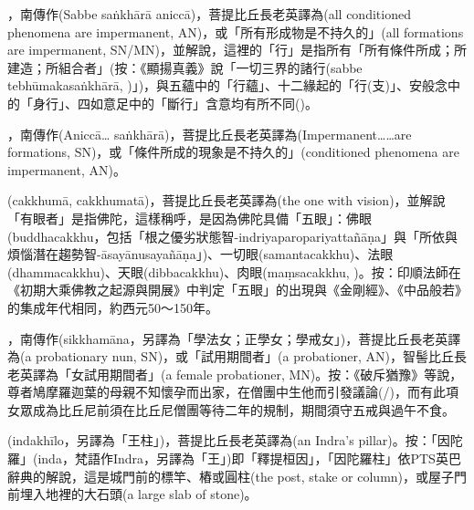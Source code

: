 \startitemgroup[noteitems]
\item{}，南傳作(Sabbe saṅkhārā aniccā)，菩提比丘長老英譯為(all conditioned phenomena are impermanent, AN)，或「所有形成物是不持久的」(all formations are impermanent, SN/MN)，並解說，這裡的「行」是指所有「所有條件所成；所建造；所組合者」(按：《顯揚真義》說「一切三界的諸行(sabbe tebhūmakasaṅkhārā, )」)，與五蘊中的「行蘊」、十二緣起的「行(支)」、安般念中的「身行」、四如意足中的「斷行」含意均有所不同()。
\item{}，南傳作(Aniccā… saṅkhārā)，菩提比丘長老英譯為(Impermanent……are formations, SN)，或「條件所成的現象是不持久的」(conditioned phenomena are impermanent, AN)。
\stopitemgroup

\startitemgroup[noteitems]
\item{}(cakkhumā, cakkhumatā)，菩提比丘長老英譯為(the one with vision)，並解說「有眼者」是指佛陀，這樣稱呼，是因為佛陀具備「五眼」：佛眼(buddhacakkhu，包括「根之優劣狀態智-indriyaparopariyattañāṇa」與「所依與煩惱潛在趨勢智-āsayānusayañāṇa」)、一切眼(samantacakkhu)、法眼(dhammacakkhu)、天眼(dibbacakkhu)、肉眼(maṃsacakkhu, )。按：印順法師在《初期大乘佛教之起源與開展》中判定「五眼」的出現與《金剛經》、《中品般若》的集成年代相同，約西元50～150年。
\stopitemgroup

\startitemgroup[noteitems]
\item{}，南傳作(sikkhamāna，另譯為「學法女；正學女；學戒女」)，菩提比丘長老英譯為(a probationary nun, SN)，或「試用期間者」(a probationer, AN)，智髻比丘長老英譯為「女試用期間者」(a female probationer, MN)。按：《破斥猶豫》等說，尊者鳩摩羅迦葉的母親不知懷孕而出家，在僧團中生他而引發議論(/)，而有此項女眾成為比丘尼前須在比丘尼僧團等待二年的規制，期間須守五戒與過午不食。
\stopitemgroup

\startitemgroup[noteitems]
\item{}(indakhīlo，另譯為「王柱」)，菩提比丘長老英譯為(an Indra's pillar)。按：「因陀羅」(inda，梵語作Indra，另譯為「王」)即「釋提桓因」，「因陀羅柱」依PTS英巴辭典的解說，這是城門前的標竿、樁或圓柱(the post, stake or column)，或屋子門前埋入地裡的大石頭(a large slab of stone)。
\stopitemgroup

